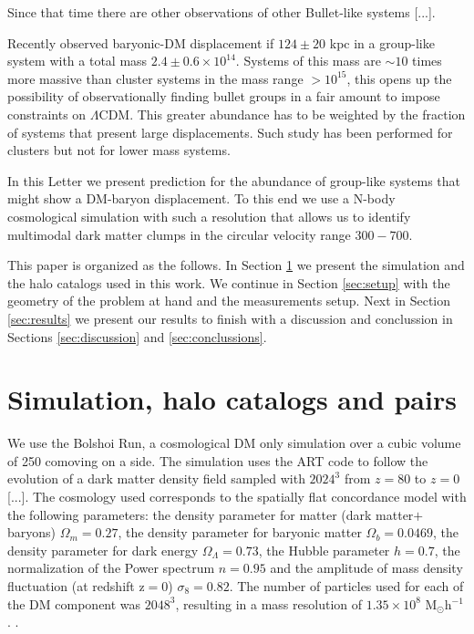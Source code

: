 \documentclass{emulateapj}
\newcommand{\hMpc}{{\ifmmode{h^{-1}{\rm Mpc}}\else{$h^{-1}$Mpc }\fi}}
\newcommand{\hMsun}{{\ifmmode{h^{-1}{\rm {M_{\odot}}}}\else{$h^{-1}{\rm{M_{\odot}}}$}\fi}}
\newcommand{\Msun}{{\ifmmode{{\rm {M_{\odot}}}}\else{${\rm{M_{\odot}}}$}\fi}}
\newcommand{\kms}{{\ifmmode{{\mathrm{\,km\ s}^{-1}}}\else{\,km~s$^{-1}$}\fi}}
\begin{document}
Since that time there are other observations of other Bullet-like
systems [...].

Recently \citep{Gastaldello} observed baryonic-DM displacement if
$124\pm 20$ kpc in a group-like system with a total mass $2.4\pm 0.6
\times 10^{14}$\Msun. Systems of this mass are $\sim 10$ times more massive
than cluster systems in the mass range $>10^{15}$\hMsun, this opens
up the possibility of observationally finding bullet groups in a fair
amount to impose constraints on $\Lambda$CDM. This greater abundance
has to be weighted by the fraction of systems that present large
displacements. Such study has been performed for clusters but not for
lower mass systems.

In this Letter we present prediction for the abundance of group-like
systems that might show a DM-baryon displacement. To this end we use a
N-body cosmological simulation with such a resolution that allows us
to identify multimodal dark matter clumps in the circular velocity
range $300-700$\kms. 

This paper is organized as the follows. In Section
\ref{sec:simulation} we present the simulation and the halo catalogs
used in this work. We continue in Section \ref{sec:setup} with the
geometry of the problem at hand and the measurements setup. Next in
Section \ref{sec:results} we present our results to finish with a
discussion and conclussion in Sections \ref{sec:discussion} and
\ref{sec:conclussions}. 


\section{Simulation, halo catalogs and pairs}
\label{sec:simulation}

We use the Bolshoi Run, a cosmological DM only simulation over a cubic
volume of 250 comoving \hMpc on a side. The simulation uses the ART code to
follow the evolution of  a dark matter density field sampled with
$2024^3$ from $z=80$ to $z=0$ [...]. The cosmology used  corresponds
to  the spatially flat concordance model with the following
parameters:  the density parameter for matter (dark matter$+$baryons)
$\Omega_m=0.27$, the density parameter for baryonic matter
$\Omega_b=0.0469$, the density parameter for dark energy
$\Omega_{\Lambda}=0.73$, the Hubble parameter $h=0.7$, the
normalization of the Power spectrum $n=0.95$ and the amplitude of mass
density fluctuation (at redshift z$=$0) $\sigma_8=0.82$.  The number
of particles used for each of the DM component was $2048^3$, resulting
in a mass resolution of $1.35 \times 10^8$
M$_{\odot}$h$^{-1}$. \citet{2011ApJ...740..102K}.  
\end{document}
